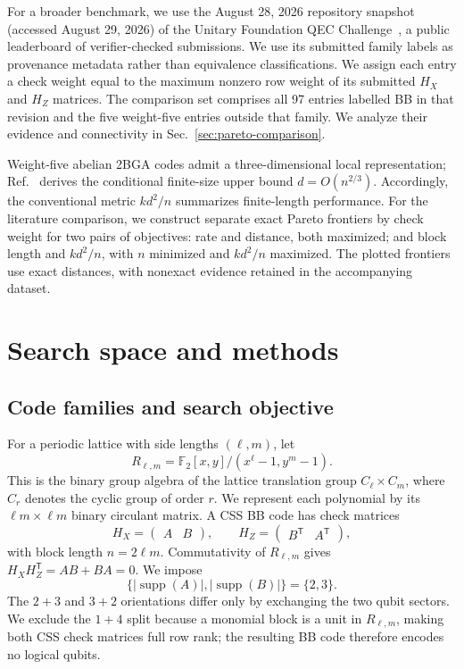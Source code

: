 \documentclass[aps,prx,twocolumn,superscriptaddress,nofootinbib,floatfix]{revtex4-2}
\newcommand{\FF}{\ensuremath{\mathbb{F}}}
\newcommand{\supp}{\ensuremath{\operatorname{supp}}}
\begin{document}
For a broader benchmark, we use the August 28, 2026 repository snapshot
(accessed August 29, 2026) of the Unitary Foundation QEC
Challenge~\cite{unitaryfoundation2026qecchallenge}, a public
leaderboard of verifier-checked submissions.  We use its submitted family
labels as provenance metadata rather than equivalence classifications.  We
assign each entry a check weight equal to the
maximum nonzero row weight of its submitted $H_X$ and $H_Z$ matrices.  The
comparison set comprises all 97 entries labelled BB in that revision and the
five weight-five entries outside that family.  We analyze their evidence and
connectivity in Sec.~\ref{sec:pareto-comparison}.

Weight-five abelian 2BGA codes admit a three-dimensional local representation;
Ref.~\cite{arnault2026variant} derives the conditional finite-size upper bound
$d=O(n^{2/3})$.  Accordingly, the conventional metric $kd^2/n$ summarizes
finite-length performance.  For the literature comparison,
we construct separate exact Pareto frontiers by check weight for two pairs of
objectives: rate and distance, both maximized; and block length and $kd^2/n$,
with $n$ minimized and $kd^2/n$ maximized.  The plotted frontiers use exact
distances, with nonexact evidence retained in
the accompanying dataset.

\section{Search space and methods}
\label{sec:campaign}

\subsection{Code families and search objective}

For a periodic lattice with side lengths $(\ell,m)$, let
\begin{equation}
R_{\ell,m}=\FF_2[x,y]/(x^\ell-1,y^m-1).
\end{equation}
This is the binary group algebra of the lattice translation group
$C_\ell\times C_m$, where $C_r$ denotes the cyclic group of order $r$.  We
represent each polynomial by its
$\ell m\times\ell m$ binary circulant matrix.  A CSS BB code has check matrices
\begin{equation}
H_X=\begin{pmatrix}A&B\end{pmatrix},\qquad
H_Z=\begin{pmatrix}B^\mathsf{T}&A^\mathsf{T}\end{pmatrix},
\label{eq:bb}
\end{equation}
with block length $n=2\ell m$.  Commutativity of $R_{\ell,m}$ gives
$H_XH_Z^\mathsf{T}=AB+BA=0$.  We impose
\begin{equation}
\{|\supp(A)|,|\supp(B)|\}=\{2,3\}.
\label{eq:weight5}
\end{equation}
The $2+3$ and $3+2$ orientations differ only by exchanging the two qubit
sectors.  We exclude the $1+4$ split because a monomial block is a unit in
$R_{\ell,m}$, making both CSS check matrices full row rank; the resulting BB
code therefore encodes no logical qubits.
\end{document}
